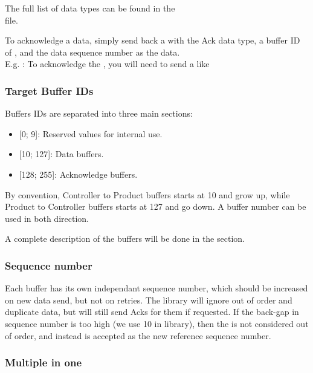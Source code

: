 The full list of data types can be found in the\\
 file.


To acknowledge a data, simply send back a  with the Ack data type, a buffer ID of , and the data sequence number as the data.\\
E.g. : To acknowledge the  , you will need to send a  like 

\subsubsection{Target Buffer IDs}

Buffers IDs are separated into three main sections:
\begin{itemize}
\item{[0; 9]: Reserved values for  internal use.}
\item{[10; 127]: Data buffers.}
\item{[128; 255]: Acknowledge buffers.}
\end{itemize}

By convention, Controller to Product buffers starts at 10 and grow up, while Product to Controller buffers starts at 127 and go down. A buffer number can be used in both direction.


A complete description of the buffers will be done in the  section.

\subsubsection{Sequence number}

Each buffer has its own independant sequence number, which should be increased on new data send, but not on retries. The  library will ignore out of order and duplicate data, but will still send Acks for them if requested. If the back-gap in sequence number is too high (we use 10 in  library), then the  is not considered out of order, and instead is accepted as the new reference sequence number.

\subsubsection{Multiple  in one }

